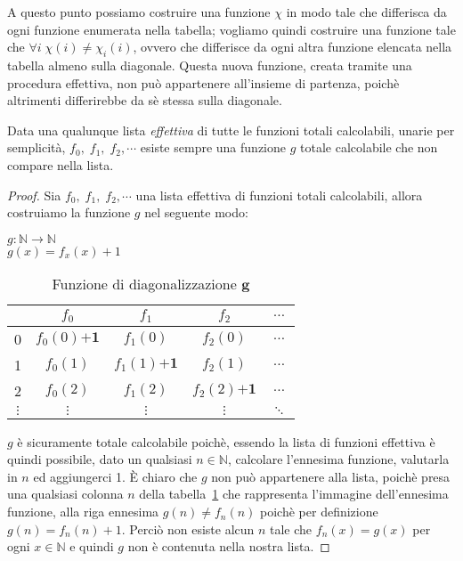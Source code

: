 A questo punto possiamo costruire una funzione $\chi$ in modo tale che
differisca da ogni funzione enumerata nella tabella; vogliamo quindi
costruire una funzione tale che $\forall i \; \chi(i) \neq
\chi_{i}(i)$, ovvero che differisce da ogni altra funzione elencata
nella tabella almeno sulla diagonale. Questa nuova funzione, creata
tramite una procedura effettiva, non può appartenere all'insieme di
partenza, poichè altrimenti differirebbe da sè stessa sulla diagonale.

\begin{prop}\label{TotCalcNonNum}
Data una qualunque lista \emph{effettiva} di tutte le funzioni totali
calcolabili, unarie per semplicit\`a, $f_{0},\; f_{1},\; f_{2},
\cdots$ esiste sempre una funzione $g$ totale calcolabile che non
compare nella lista.
\end{prop}
\begin{proof}
Sia $f_{0},\; f_{1},\; f_{2}, \cdots$ una lista effettiva di funzioni
totali calcolabili, allora costruiamo la funzione $g$ nel seguente
modo:

\begin{center}
$g: \mathbb{N} \to \mathbb{N}$\\
$g(x) = f_{x}(x) + 1$
\end{center}
\begin{table}[!h]
\begin{center}
\begin{tabular}{|c|c|c|c|c}

\hline
 & $f_0$ & $f_1$ & $f_2$ & $\ldots$\\
\hline
0 & $f_0(0) \mathbf{+1}$ & $f_1(0)$  & $f_2(0)$  & $\ldots$\\
\hline
1 & $f_0(1)$ & $f_1(1) \mathbf{+1}$  & $f_2(1)$  & $\ldots$\\
\hline
2 &  $f_0(2)$ & $f_1(2)$  & $f_2(2) \mathbf{+1}$  & $\ldots$\\
\hline
$\vdots$ & $\vdots$ &       $\vdots$  & $\vdots$  & $\ddots$\\
\end{tabular}
\end{center}
\caption{Funzione di diagonalizzazione $\mathbf{g}$}
\label{diagG}
\end{table}

$g$ è sicuramente totale calcolabile poichè, essendo la lista di
funzioni effettiva è quindi possibile, dato un qualsiasi $n \in
\mathbb{N}$, calcolare l'ennesima funzione, valutarla in $n$ ed
aggiungerci 1. È chiaro che $g$ non può appartenere alla lista, poichè
presa una qualsiasi colonna $n$ della tabella~\ref{diagG} che
rappresenta l'immagine dell'ennesima funzione, alla riga ennesima
$g(n) \neq f_{n}(n)$ poichè per definizione $g(n)=f_{n}(n)+1$. Perciò
non esiste alcun $n$ tale che $f_{n}(x)=g(x)$ per ogni $x \in
\mathbb{N}$ e quindi $g$ non è contenuta nella nostra lista.
\end{proof}

